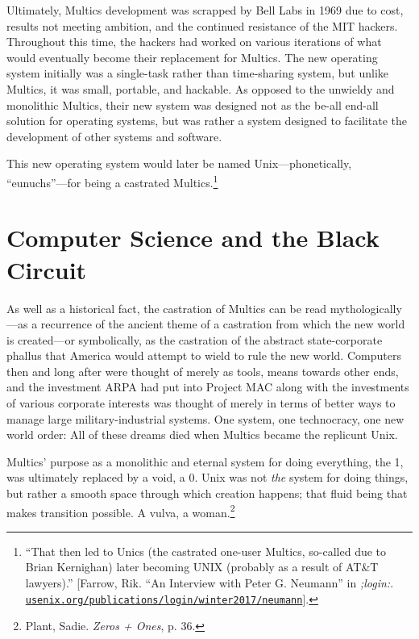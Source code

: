 \documentclass[10pt, statementpaper, twoside, openright]{memoir}
\begin{document}
Ultimately, Multics development was scrapped by Bell Labs in 1969 due to cost, results not meeting ambition, and the continued resistance of the MIT hackers. Throughout this time, the hackers had worked on various iterations of what would eventually become their replacement for Multics. The new operating system initially was a single-task rather than time-sharing system, but unlike Multics, it was small, portable, and hackable. As opposed to the unwieldy and monolithic Multics, their new system was designed not as the be-all end-all solution for operating systems, but was rather a system designed to facilitate the development of other systems and software.

This new operating system would later be named Unix---phonetically, ``eunuchs''---for being a castrated Multics.\footnote{``That then led to Unics (the castrated one-user Multics, so-called due to Brian Kernighan) later becoming UNIX (probably as a result of AT\&T lawyers).'' [Farrow, Rik. ``An Interview with Peter G. Neumann'' in \textit{;login:}. \href{https://www.usenix.org/publications/login/winter2017/neumann}{\nolinkurl{usenix.org/publications/login/winter2017/neumann}}].}

\chapter{Computer Science and the Black Circuit}

As well as a historical fact, the castration of Multics can be read mythologically---as a recurrence of the ancient theme of a castration from which the new world is created---or symbolically, as the castration of the abstract state-corporate phallus that America would attempt to wield to rule the new world. Computers then and long after were thought of merely as tools, means towards other ends, and the investment ARPA had put into Project MAC along with the investments of various corporate interests was thought of merely in terms of better ways to manage large military-industrial systems. One system, one technocracy, one new world order: All of these dreams died when Multics became the replicunt Unix.

Multics' purpose as a monolithic and eternal system for doing everything, the 1, was ultimately replaced by a void, a 0. Unix was not \emph{the} system for doing things, but rather a smooth space through which creation happens; that fluid being that makes transition possible. A vulva, a woman.\footnote{Plant, Sadie. \textit{Zeros + Ones}, p. 36.}
\end{document}
